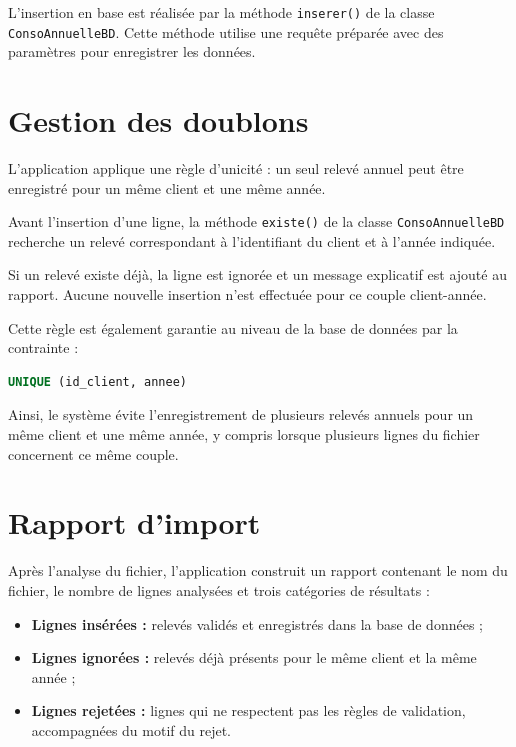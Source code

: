 L'insertion en base est réalisée par la méthode \texttt{inserer()} de la classe \texttt{ConsoAnnuelleBD}. Cette méthode utilise une requête préparée avec des paramètres pour enregistrer les données.

\section{Gestion des doublons}

L'application applique une règle d'unicité : un seul relevé annuel peut être enregistré pour un même client et une même année.

Avant l'insertion d'une ligne, la méthode \texttt{existe()} de la classe \texttt{ConsoAnnuelleBD} recherche un relevé correspondant à l'identifiant du client et à l'année indiquée.

Si un relevé existe déjà, la ligne est ignorée et un message explicatif est ajouté au rapport. Aucune nouvelle insertion n'est effectuée pour ce couple client-année.

Cette règle est également garantie au niveau de la base de données par la contrainte :

\begin{lstlisting}[language=SQL]
UNIQUE (id_client, annee)
\end{lstlisting}

Ainsi, le système évite l'enregistrement de plusieurs relevés annuels pour un même client et une même année, y compris lorsque plusieurs lignes du fichier concernent ce même couple.

\section{Rapport d'import}

Après l'analyse du fichier, l'application construit un rapport contenant le nom du fichier, le nombre de lignes analysées et trois catégories de résultats :

\begin{itemize}
    \item \textbf{Lignes insérées :} relevés validés et enregistrés dans la base de données ;
    \item \textbf{Lignes ignorées :} relevés déjà présents pour le même client et la même année ;
    \item \textbf{Lignes rejetées :} lignes qui ne respectent pas les règles de validation, accompagnées du motif du rejet.
\end{itemize}

